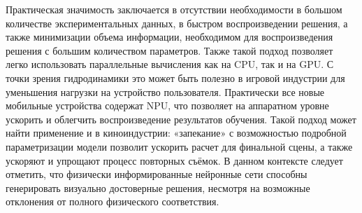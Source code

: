 Практическая значимость заключается в отсутствии необходимости в большом количестве
экспериментальных данных, в быстром воспроизведении решения, а также минимизации
объема информации, необходимом для воспроизведения решения с большим количеством
параметров. Также такой подход позволяет легко использовать параллельные вычисления
как на CPU, так и на GPU. С точки зрения гидродинамики это может быть полезно в игровой индустрии
для уменьшения нагрузки на устройство пользователя. Практически все новые мобильные
устройства содержат NPU, что позволяет на аппаратном уровне ускорить и облегчить
воспроизведение результатов обучения. Такой подход может найти применение и в 
киноиндустрии: «запекание» с возможностью подробной параметризации модели позволит
ускорить расчет для финальной сцены, а также ускоряют и упрощают процесс повторных съёмок.
В данном контексте следует отметить, что физически информированные нейронные сети способны
генерировать визуально достоверные решения, несмотря на возможные отклонения от полного
физического соответствия.

